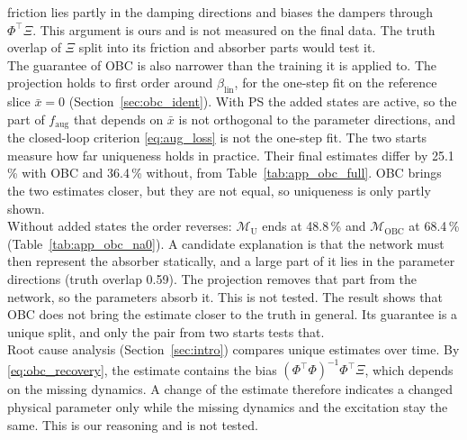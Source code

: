 friction lies partly in the damping directions and biases the dampers
through $\Phi^\top\Xi$.
This argument is ours and is not measured on the final data.
The truth overlap of $\Xi$ split into its friction and absorber parts would
test it.
\\
The guarantee of OBC is also narrower than the training it is applied to.
The projection holds to first order around $\beta_{\mathrm{lin}}$, for the
one-step fit on the reference slice $\bar x=0$
(Section~\ref{sec:obc_ident}).
With PS the added states are active, so the part of $f_{\mathrm{aug}}$ that
depends on $\bar x$ is not orthogonal to the parameter directions, and the
closed-loop criterion \eqref{eq:aug_loss} is not the one-step fit.
The two starts measure how far uniqueness holds in practice.
Their final estimates differ by 25.1\,\% with OBC and 36.4\,\% without, from
Table~\ref{tab:app_obc_full}.
OBC brings the two estimates closer, but they are not equal, so uniqueness is
only partly shown.
\\
Without added states the order reverses: $\mathcal M_{\mathrm U}$ ends at
48.8\,\% and $\mathcal M_{\mathrm{OBC}}$ at 68.4\,\%
(Table~\ref{tab:app_obc_na0}).
A candidate explanation is that the network must then represent the absorber
statically, and a large part of it lies in the parameter directions (truth
overlap 0.59).
The projection removes that part from the network, so the parameters absorb
it.
This is not tested.
The result shows that OBC does not bring the estimate closer to the truth in
general.
Its guarantee is a unique split, and only the pair from two starts tests that.
\\
Root cause analysis (Section~\ref{sec:intro}) compares unique estimates
over time.
By \eqref{eq:obc_recovery}, the estimate contains the bias
$(\Phi^\top\Phi)^{-1}\Phi^\top\Xi$, which depends on the missing dynamics.
A change of the estimate therefore indicates a changed physical parameter
only while the missing dynamics and the excitation stay the same.
This is our reasoning and is not tested.

